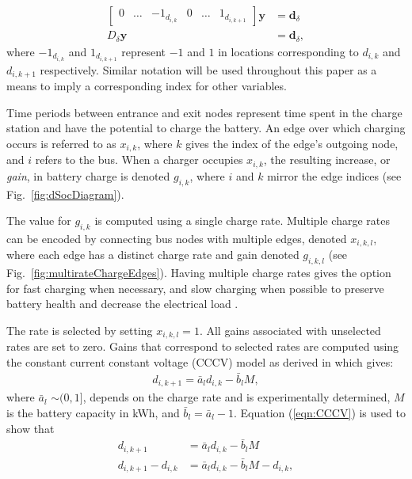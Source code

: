 \begin{equation}\label{eqn:deltaFinal}
	\begin{aligned}
		\begin{bmatrix}0 & \hdots & -1_{d_{i,k}} & 0 & \hdots & 1_{d_{i,k+1}} \end{bmatrix} \mathbf{y} &= \mathbf{d}_\delta \\
			D_\delta\mathbf{y} &= \mathbf{d}_\delta,
	\end{aligned}
\end{equation}
where $-1_{d_{i,k}}$ and $1_{d_{i,k+1}}$ represent $-1$ and $1$ in locations corresponding to $d_{i,k}$ and $d_{i,k+1}$ respectively. Similar notation will be used throughout this paper as a means to imply a corresponding index for other variables.
\par Time periods between entrance and exit nodes represent time spent in the charge station and have the potential to charge the battery. An edge over which charging occurs is referred to as $x_{i,k}$, where $k$ gives the index of the edge's outgoing node, and $i$ refers to the bus.  When a charger occupies $x_{i,k}$, the resulting increase, or \textit{gain}, in battery charge is denoted $g_{i,k}$, where $i$ and $k$ mirror the edge indices (see Fig.~\ref{fig:dSocDiagram}). 
\par The value for $g_{i,k}$ is computed using a single charge rate. Multiple charge rates can be encoded by connecting bus nodes with multiple edges, denoted $x_{i,k,l}$, where each edge has a distinct charge rate and gain denoted $g_{i,k,l}$ (see Fig.~\ref{fig:multirateChargeEdges}). Having multiple charge rates gives the option for fast charging when necessary, and slow charging when possible to preserve battery health and decrease the electrical load \cite{houbbadi_optimal_2019}.


\par The rate is selected by setting $x_{i,k,l} = 1$. All gains associated with unselected rates are set to zero. Gains that correspond to selected rates are computed using the constant current constant voltage (CCCV) model as derived in \cite{whitaker_network_2021} which gives:
\begin{align}\label{eqn:CCCV}
	d_{i,k+1} = \bar{a}_ld_{i,k} - \bar{b}_lM, 
\end{align}
where $\bar{a}_l$ $\sim(0,1]$, depends on the charge rate and is experimentally determined, $M$ is the battery capacity in kWh, and $\bar{b}_l = \bar{a}_l - 1$.
Equation (\ref{eqn:CCCV}) is used to show that
\begin{equation}\label{eqn:g}
\begin{aligned}
	d_{i,k+1} &= \bar{a}_ld_{i,k} - \bar{b}_lM \\ 
	d_{i,k+1} - d_{i,k} &= \bar{a}_ld_{i,k} - \bar{b}_lM - d_{i,k},\\
\end{aligned}
\end{equation}
